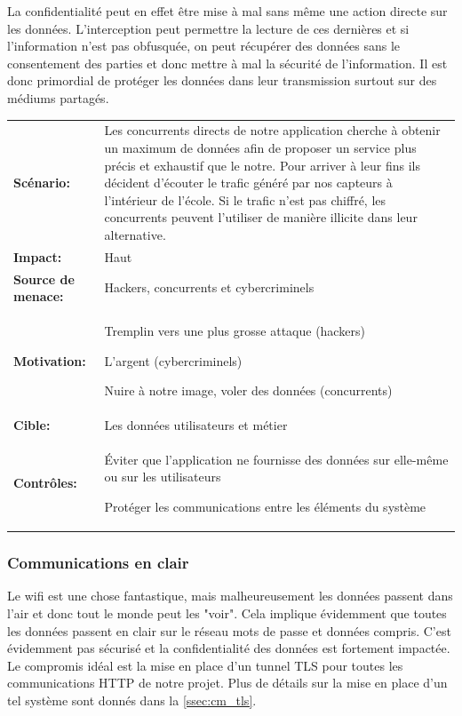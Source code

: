 \documentclass[12pt]{article}
\begin{document}
La confidentialité peut en effet être mise à mal sans même une action directe sur les données. L'interception peut permettre la lecture de ces dernières et si l'information n'est pas obfusquée, on peut récupérer des données sans le consentement des parties et donc mettre à mal la sécurité de l'information. Il est donc primordial de protéger les données dans leur transmission surtout sur des médiums partagés.
\medskip

\renewcommand{\arraystretch}{1.6}
\begin{tabular}{@{}p{4cm}p{12cm}}
\textbf{Scénario:} &  Les concurrents directs de notre application cherche à obtenir un maximum de données afin de proposer un service plus précis et exhaustif que le notre. Pour arriver à leur fins ils décident d'écouter le trafic généré par nos capteurs à l'intérieur de l'école. Si le trafic n'est pas chiffré, les concurrents peuvent l'utiliser de manière illicite dans leur alternative.\\
\textbf{Impact:} & Haut \\
\textbf{Source de menace: } & Hackers, concurrents et cybercriminels \\
\textbf{Motivation:} & Tremplin vers une plus grosse attaque (hackers)

L'argent (cybercriminels)

Nuire à notre image, voler des données (concurrents)\\
\textbf{Cible:} & Les données utilisateurs et métier \\
\textbf{Contrôles:} & Éviter que l'application ne fournisse des données sur elle-même ou sur les utilisateurs

Protéger les communications entre les éléments du système
\end{tabular}
\renewcommand{\arraystretch}{1}

\subsubsection{Communications en clair}

Le wifi est une chose fantastique, mais malheureusement les données passent dans l'air et donc tout le monde peut les "voir". Cela implique évidemment que toutes les données passent en clair sur le réseau mots de passe et données compris. C'est évidemment pas sécurisé et la confidentialité des données est fortement impactée. Le compromis idéal est la mise en place d'un tunnel TLS pour toutes les communications HTTP de notre projet. Plus de détails sur la mise en place d'un tel système sont donnés dans la \autoref{ssec:cm_tls}.
\end{document}
